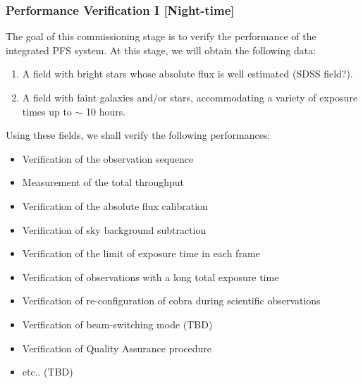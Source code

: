 \subsubsection{Performance Verification I [Night-time]}\label{secflow:PV1}



The goal of this commissioning stage is to verify the performance of the integrated PFS system. 
At this stage, we will obtain the following data:
\begin{enumerate}
\renewcommand{\labelenumi}{Set \Roman{enumi}).}
\setlength{\leftskip}{20mm}
\item A field with bright stars whose absolute flux is well estimated (SDSS field?).
\item A field with faint galaxies and/or stars, accommodating a variety of exposure times up to $\sim$ 10 hours.
\end{enumerate}


Using these fields, we shall verify the following performances:
\begin{itemize}
\item{Verification of the observation sequence}
\item{Measurement of the total throughput}
\item{Verification of the absolute flux calibration}
\item{Verification of sky background subtraction}
\item{Verification of the limit of exposure time in each frame}
\item{Verification of observations with a long total exposure time}
\item{Verification of re-configuration of cobra during scientific observations}
\item{Verification of beam-switching mode (TBD)}
\item{Verification of Quality Assurance procedure}
\item{ etc.. (TBD)}
\end{itemize}

